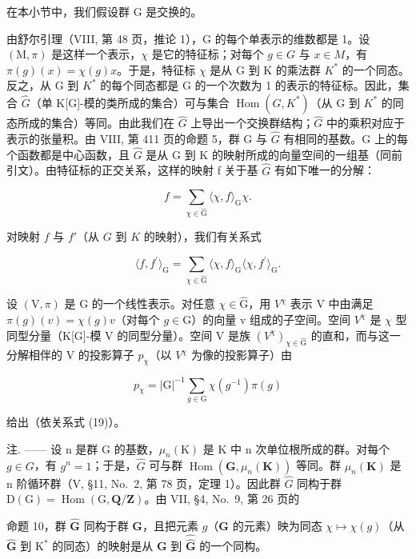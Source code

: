 在本小节中，我们假设群 \(\mathrm{G}\) 是交换的。

由舒尔引理（VIII, 第 48 页，推论 1），G 的每个单表示的维数都是 1。设 \((\mathrm{M},\pi)\) 是这样一个表示，\(\chi\) 是它的特征标；对每个 \(g\in G\) 与 \(x\in M\)，有 \(\pi(g)(x)=\chi(g)x\)。于是，特征标 \(\chi\) 是从 G 到 K 的乘法群 \(K^{*}\) 的一个同态。反之，从 G 到 \(K^{*}\) 的每个同态都是 G 的一个次数为 1 的表示的特征标。因此，集合 \(\widehat{G}\)（单 K{[}G{]}-模的类所成的集合）可与集合 \(\operatorname{Hom}(G,K^{*})\)（从 G 到 \(K^{*}\) 的同态所成的集合）等同。由此我们在 \(\widehat{G}\) 上导出一个交换群结构；\(\widehat{G}\) 中的乘积对应于表示的张量积。由 VIII, 第 411 页的命题 5，群 G 与 \(\widehat{G}\) 有相同的基数。G 上的每个函数都是中心函数，且 \(\widehat{G}\) 是从 G 到 K 的映射所成的向量空间的一组基（同前引文）。由特征标的正交关系，这样的映射 f 关于基 \(\widehat{G}\) 有如下唯一的分解：

\[
f = \sum_ {\chi \in \widehat {\mathrm{G}}} \langle \chi , f \rangle_ {\mathrm{G}} \chi .\tag{39}
\]

对映射 \(f\) 与 \(f'\)（从 \(G\) 到 \(K\) 的映射），我们有关系式

\[
\langle f, f ^ {\prime} \rangle_ {\mathrm{G}} = \sum_ {\chi \in \widehat {\mathrm{G}}} \langle \chi , f \rangle_ {\mathrm{G}} \langle \chi , f ^ {\prime} \rangle_ {\mathrm{G}}.\tag{40}
\]

设 \((\mathrm{V},\pi)\) 是 G 的一个线性表示。对任意 \(\chi\in\widehat{\mathrm{G}}\)，用 \(V^{\chi}\) 表示 V 中由满足 \(\pi(g)(v)=\chi(g)v\)（对每个 \(g\in\mathrm{G}\)）的向量 v 组成的子空间。空间 \(V^{\chi}\) 是 \(\chi\) 型同型分量（K{[}G{]}-模 V 的同型分量）。空间 V 是族 \((V^{\chi})_{\chi\in\widehat{\mathrm{G}}}\) 的直和，而与这一分解相伴的 V 的投影算子 \(p_{\chi}\)（以 \(V^{\chi}\) 为像的投影算子）由

\[
p _ {\chi} = | \mathrm{G} | ^ {- 1} \sum_ {g \in \mathrm{G}} \chi (g ^ {- 1}) \pi (g)\tag{41}
\]

给出（依关系式 (19)）。

注. —— 设 n 是群 G 的基数，\(\mu_{n}(\mathrm{K})\) 是 K 中 n 次单位根所成的群。对每个 \(g \in G\)，有 \(g^{n} = 1\)；于是，\(\widehat{G}\) 可与群 \(\operatorname{Hom}(\mathbf{G}, \mu_{n}(\mathbf{K}))\) 等同。群 \(\mu_{n}(\mathbf{K})\) 是 n 阶循环群（V, §11, No.~2, 第 78 页，定理 1）。因此群 \(\widehat{G}\) 同构于群 \(\mathrm{D}(\mathrm{G}) = \operatorname{Hom}(\mathrm{G}, \mathbf{Q}/\mathbf{Z})\)。由 VII, §4, No.~9, 第 26 页的

命题 10，群 \(\widehat{\mathbf{G}}\) 同构于群 \(\mathbf{G}\)，且把元素 \(g\)（\(\mathbf{G}\) 的元素）映为同态 \(\chi \mapsto \chi(g)\)（从 \(\widehat{\mathbf{G}}\) 到 \(\mathrm{K}^*\) 的同态）的映射是从 \(\mathbf{G}\) 到 \(\widehat{\widehat{\mathbf{G}}}\) 的一个同构。
